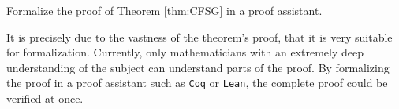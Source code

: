 \begin{problem}
    Formalize the proof of Theorem \ref{thm:CFSG} in a proof assistant. 
\end{problem}

It is precisely due to the vastness of the theorem’s proof, that it is very suitable for formalization. Currently, only mathematicians with an extremely deep understanding of the subject can understand parts of the proof. 
By formalizing the proof in a proof assistant such as \lstinline{Coq} or \lstinline{Lean}, 
the complete proof could be verified at once. 